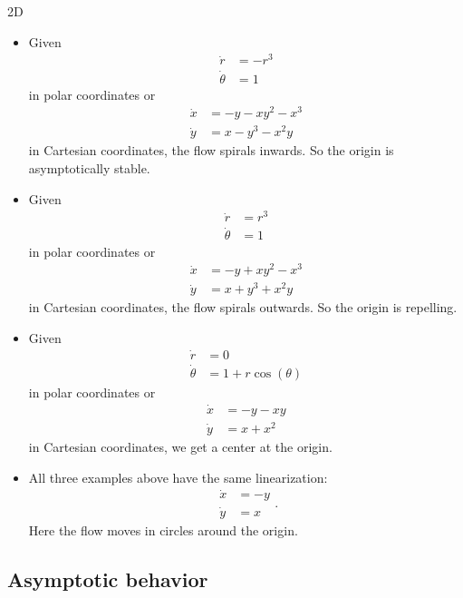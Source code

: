 \documentclass{article}
\begin{document}
\begin{exam}
    2D
    \begin{itemize}
        \item Given
        $$\begin{aligned}\dot r &= -r^3\\
        \dot \theta &= 1\end{aligned}$$
        in polar coordinates or
        $$\begin{aligned}\dot x &= -y-xy^2-x^3\\
        \dot y &= x-y^3-x^2y\end{aligned}$$
        in Cartesian coordinates, the flow spirals inwards. So the origin is asymptotically stable.

        \item Given
        $$\begin{aligned}\dot r &= r^3\\
        \dot \theta &= 1\end{aligned}$$
        in polar coordinates or
        $$\begin{aligned}\dot x &= -y+xy^2-x^3\\
        \dot y &= x+y^3+x^2y\end{aligned}$$
        in Cartesian coordinates, the flow spirals outwards. So the origin is repelling.

        \item Given
        $$\begin{aligned}\dot r &= 0\\
        \dot \theta &= 1+r\cos(\theta)\end{aligned}$$
        in polar coordinates or
        $$\begin{aligned}\dot x &= -y-xy\\
        \dot y &= x+x^2\end{aligned}$$
        in Cartesian coordinates, we get a center at the origin.

        \item All three examples above have the same linearization:
        $$\begin{aligned}\dot x &= -y\\
        \dot y &= x\end{aligned}.$$
        Here the flow moves in circles around the origin.
    \end{itemize}
\end{exam}

\subsection{Asymptotic behavior}
\end{document}
